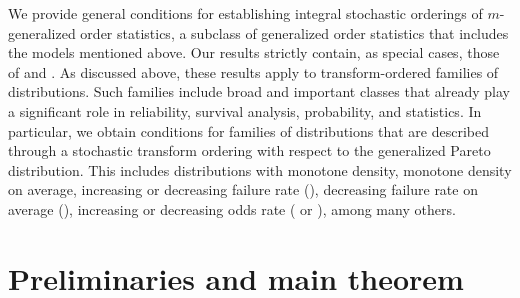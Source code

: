 \documentclass [11pt]{article}
\begin{document}
We provide general conditions for establishing integral stochastic orderings of $m$-generalized order statistics, a subclass of generalized order statistics that includes the models mentioned above. Our results strictly contain, as special cases, those of \cite{ALO-JAP} and \cite{lando2021st}. As discussed above, these results apply to transform-ordered families of distributions. Such families include broad and important classes that already play a significant role in reliability, survival analysis, probability, and statistics. In particular, we obtain conditions for families of distributions that are described through a stochastic transform ordering with respect to the generalized Pareto distribution. This includes distributions with monotone density, monotone density on average, increasing or decreasing failure rate (\cite{marshall2007}), decreasing failure rate on average (\cite{marshall2007}), increasing or decreasing odds rate (\cite{oddspaper} or \cite{superpareto2025}), among many others.



\section{Preliminaries and main theorem}
\end{document}
